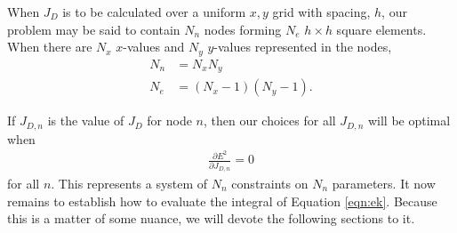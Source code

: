 When $J_D$ is to be calculated over a uniform $x,y$ grid with spacing, $h$, our problem may be said to contain $N_n$ nodes forming $N_e$ $h\times h$ square elements.  When there are $N_x$ $x$-values and $N_y$ $y$-values represented in the nodes,
\begin{align}
N_n &= N_x N_y\\
N_e &= (N_x -1)(N_y -1).
\end{align}

If $J_{D,n}$ is the value of $J_D$ for node $n$, then our choices for all $J_{D,n}$ will be optimal when
\begin{align}
\frac{\partial E^2}{\partial J_{D,n}} = 0
\end{align}
for all $n$.  This represents a system of $N_n$ constraints on $N_n$ parameters.  It now remains to establish how to evaluate the integral of Equation \ref{eqn:ek}.  Because this is a matter of some nuance, we will devote the following sections to it.
